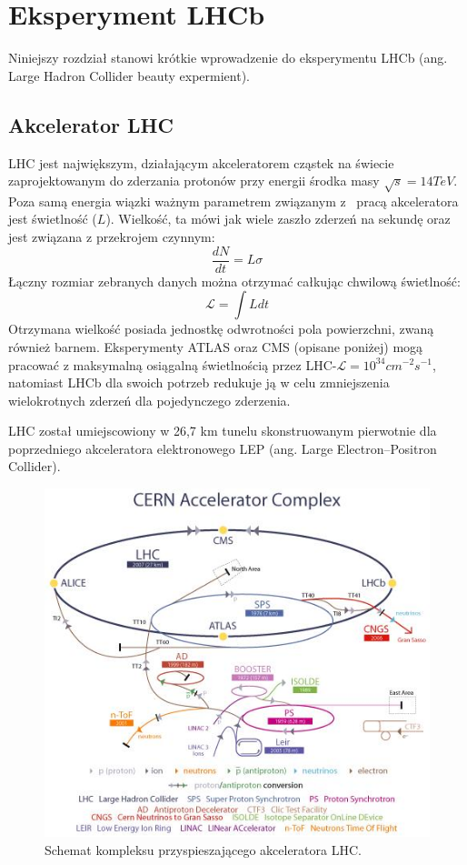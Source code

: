 \chapter{Eksperyment LHCb}

Niniejszy rozdział stanowi krótkie wprowadzenie do eksperymentu LHCb (ang. Large Hadron Collider beauty expermient).

\section{Akcelerator LHC}
\indent LHC jest największym, działającym akceleratorem cząstek na świecie zaprojektowanym do zderzania protonów przy energii środka masy $\sqrt{s}=14 TeV$. Poza samą energia wiązki ważnym parametrem związanym z~ pracą akceleratora jest  świetlność ($L$). Wielkość, ta mówi jak wiele zaszło zderzeń na sekundę oraz jest związana z przekrojem czynnym:
\begin{equation}
\frac{dN}{dt} =L \sigma
\end{equation}
Łączny rozmiar zebranych danych można otrzymać całkując chwilową świetlność:
\begin{equation}
\mathcal{L} = \int L dt
\end{equation}
Otrzymana wielkość posiada jednostkę odwrotności pola powierzchni, zwaną również barnem. Eksperymenty ATLAS oraz CMS (opisane poniżej) mogą pracować z maksymalną osiągalną świetlnością przez LHC-$\mathcal{L}=10^{34}cm^{-2}s^{-1}$, natomiast LHCb dla swoich potrzeb redukuje ją w celu zmniejszenia  wielokrotnych zderzeń dla pojedynczego zderzenia. 

LHC został umiejscowiony w 26,7 km tunelu skonstruowanym pierwotnie dla poprzedniego akceleratora elektronowego LEP (ang. Large Electron–Positron Collider). 
\begin{figure}[h]
  \centering
  \includegraphics[scale=1.1]{rozdzial2/AccComple.jpeg}
  \caption{Schemat kompleksu przyspieszającego akceleratora LHC. \cite{public}}
  \label{fig:AccComplex}
\end{figure}

